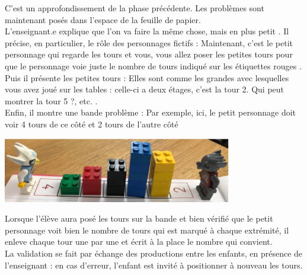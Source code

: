 \begin{exercice*}
   C'est un approfondissement de la phase précédente. Les problèmes sont maintenant posés dans l'espace de la feuille de papier. \\
   L'enseignant.e explique que l'on va faire \og la même chose, mais en plus petit \fg. Il précise, en particulier, le rôle des personnages fictifs : \og Maintenant, c’est le petit personnage qui regarde les tours et vous, vous allez poser les petites tours pour que le personnage voie juste le nombre de tours indiqué sur les étiquettes rouges \fg. \\
   Puis il présente les petites tours : \og Elles sont comme les grandes avec lesquelles vous avez joué sur les tables : celle-ci a deux étages, c'est la tour 2. Qui peut montrer la tour 5 ?, etc. \fg. \\
   Enfin, il montre une bande problème : \og Par exemple, ici, le petit personnage doit voir 4 tours de ce côté et 2 tours de l’autre côté \fg
   \begin{center}
      \includegraphics[width=10cm]{Geometrie_did/Images/Geo6_activites_tours10}
   \end{center}
   Lorsque l'élève aura posé les tours sur la bande et bien vérifié que le petit personnage voit bien le nombre de tours qui est marqué à chaque extrémité, il enleve chaque tour une par une et écrit à la place le nombre qui convient. \\
   La validation se fait par échange des productions entre les enfants, en présence de l’enseignant : en cas d'erreur, l'enfant est invité à positionner à nouveau les tours. \\


\end{exercice*}
